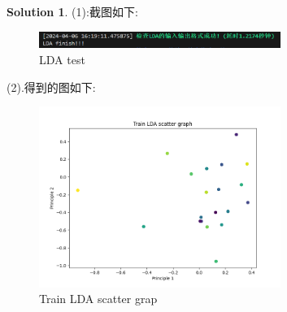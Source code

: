 \documentclass[a4paper]{article}
\numberwithin{equation}{section}
\theoremstyle{definition}
\newtheorem*{solution}{Solution}
\begin{document}
\begin{solution}
	(1):截图如下:\\
    \begin{figure}[H]
		\centering
		\includegraphics[width=0.7\textwidth]{LDA.png}
		\caption{LDA test}
		\label{LDA test}
	\end{figure}
    (2).得到的图如下:\\
    \begin{figure}[H]
		\centering
		\includegraphics[width=0.7\textwidth]{Train LDA scatter graph.png}
		\caption{Train LDA scatter grap}
		\label{Train LDA scatter graph}
	\end{figure}


\end{solution}
\end{document}
